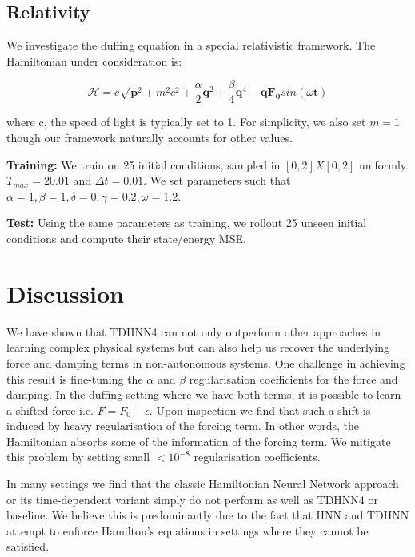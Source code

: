 \documentclass[twoside]{article}
\begin{document}
\subsection{Relativity}

We investigate the duffing equation in a special relativistic framework. The Hamiltonian under consideration is:

\begin{equation}
\mathcal{H} =  c\sqrt{\mathbf{p}^2 +m^2c^2} + \frac{\alpha}{2}\mathbf{q}^2 +\frac{\beta}{4}\mathbf{q}^4 - \mathbf{q}\mathbf{F_0}sin(\omega \mathbf{t})
\end{equation}

where c, the speed of light is typically set to 1. For simplicity, we also set $m=1$ though our framework naturally accounts for other values.

\textbf{Training:} We train on 25 initial conditions, sampled in $[0,2]X[0,2]$ uniformly. $T_{max} = 20.01$ and $\Delta t = 0.01$. We set parameters such that $\alpha =1, \beta =1,\delta =0,\gamma = 0.2,\omega = 1.2$.

\textbf{Test:} Using the same parameters as training, we rollout 25 unseen initial conditions and compute their state/energy MSE.



\section{Discussion}

We have shown that TDHNN4 can not only outperform other approaches in learning complex physical systems but can also help us recover the underlying force and damping terms in non-autonomous systems. One challenge in achieving this result is fine-tuning the $\alpha$ and $\beta$ regularisation coefficients for the force and damping. In the duffing setting where we have both terms, it is possible to learn a shifted force i.e. $F = F_0 + \epsilon$. Upon inspection we find that such a shift is induced by heavy regularisation of the forcing term. In other words, the Hamiltonian absorbs some of the information of the forcing term. We mitigate this problem by setting small $< 10^{-8}$ regularisation coefficients.

In many settings we find that the classic Hamiltonian Neural Network approach or its time-dependent variant simply do not perform as well as TDHNN4 or baseline. We believe this is predominantly due to the fact that HNN and TDHNN attempt to enforce Hamilton's equations in settings where they cannot be satisfied.
\end{document}
